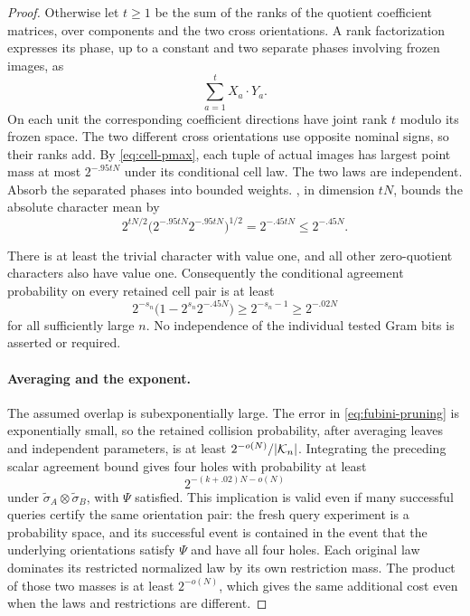 \begin{proof}
Otherwise let $t\ge1$ be the sum of the ranks of the quotient
coefficient matrices, over components and the two cross
orientations.  A rank factorization expresses its phase,
up to a constant and two separate phases involving frozen
images, as
\[
 \sum_{a=1}^t X_a\cdot Y_a.
\]
On each unit the corresponding coefficient directions have
joint rank $t$ modulo its frozen space.  The two different
cross orientations use opposite nominal signs, so their
ranks add.  By \eqref{eq:cell-pmax}, each tuple of actual
images has largest point mass at most $2^{-.95tN}$ under
its conditional cell law.  The two laws are independent.
Absorb the separated phases into bounded weights.
, in dimension $tN$, bounds the absolute
character mean by
\begin{equation}\label{eq:gram-character-bound}
 2^{tN/2}\bigl(2^{-.95tN}2^{-.95tN}\bigr)^{1/2}
 =2^{-.45tN}\le2^{-.45N}.
\end{equation}

There is at least the trivial character with value one, and
all other zero-quotient characters also have value one.
Consequently the conditional agreement probability on every
retained cell pair is at least
\[
 2^{-s_n}\bigl(1-2^{s_n}2^{-.45N}\bigr)
 \ge2^{-s_n-1}\ge2^{-.02N}
\]
for all sufficiently large $n$.  No independence of the
individual tested Gram bits is asserted or required.

\paragraph{Averaging and the exponent.}
The assumed overlap is subexponentially large.  The error
in \eqref{eq:fubini-pruning} is exponentially small, so the
retained collision probability, after averaging leaves and
independent parameters, is at least
$2^{-o(N)}/|\mathcal K_n|$.  Integrating the preceding scalar
agreement bound gives four holes with probability at least
\[
 2^{-(k+.02)N-o(N)}
\]
under $\widetilde\sigma_A\otimes\widetilde\sigma_B$, with
$\Psi$ satisfied.  This implication is valid even
if many successful queries certify the same orientation
pair: the fresh query experiment is a probability space,
and its successful event is contained in the event that
the underlying orientations satisfy $\Psi$ and have all four
holes.  Each original law dominates its restricted normalized
law by its own restriction mass.  The product of those two
masses is at least $2^{-o(N)}$, which gives the same additional
cost even when the laws and restrictions are different.


\end{proof}
